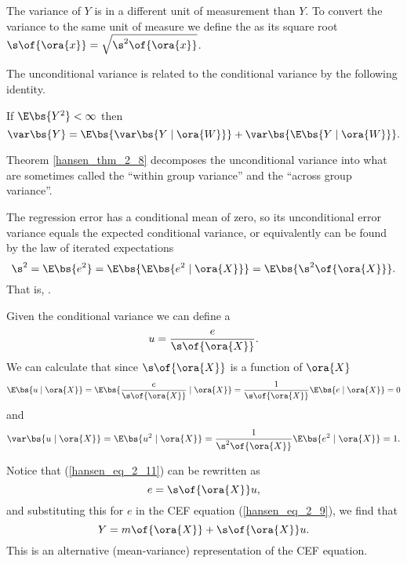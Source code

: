 The variance of $Y$ is in a different unit of measurement than $Y$. To convert the variance to the same unit of measure we define the  as its square root $\s\of{\ora{x}} = \sqrt{\s^2\of{\ora{x}}}$.

The unconditional variance is related to the conditional variance by the following identity. 
\begin{theorem}
    \label{hansen_thm_2_8}
    If $\E\bs{Y^2} < \infty$ then 
    \begin{equation}
        \notag
        \var\bs{Y} = \E\bs{\var\bs{Y \mid \ora{W}}} + \var\bs{\E\bs{Y \mid \ora{W}}}.
    \end{equation}
\end{theorem}
Theorem \ref{hansen_thm_2_8} decomposes the unconditional variance into what are sometimes called the ``within group variance'' and the ``across group variance''.

The regression error has a conditional mean of zero, so its unconditional error variance equals the expected conditional variance, or equivalently can be found by the law of iterated expectations
\begin{equation}
    \notag
    \s^2 = \E\bs{e^2} = \E\bs{\E\bs{e^2 \mid \ora{X}}} = \E\bs{\s^2\of{\ora{X}}}.
\end{equation}
That is, .

Given the conditional variance we can define a 
\begin{equation}
    \label{hansen_eq_2_11}
    u = \frac{e}{\s\of{\ora{X}}}.
\end{equation}
We can calculate that since $\s\of{\ora{X}}$ is a function of $\ora{X}$
\begin{equation}
    \notag
    \E\bs{u \mid \ora{X}} = \E\bs{\frac{e}{\s\of{\ora{X}}} \mid \ora{X}} = \frac{1}{\s\of{\ora{X}}} \E\bs{e \mid \ora{X}} = 0
\end{equation}
and 
\begin{equation}
    \notag 
    \var\bs{u \mid \ora{X}} = \E\bs{u^2 \mid \ora{X}} = \frac{1}{\s^2\of{\ora{X}}} \E\bs{e^2 \mid \ora{X}} = 1.
\end{equation}

Notice that (\ref{hansen_eq_2_11}) can be rewritten as 
\begin{equation}
    \notag
    e = \s\of{\ora{X}}u, 
\end{equation}
and substituting this for $e$ in the CEF equation (\ref{hansen_eq_2_9}), we find that 
\begin{equation}
    \notag
    Y = m\of{\ora{X}} + \s\of{\ora{X}}u.
\end{equation}
This is an alternative (mean-variance) representation of the CEF equation.

